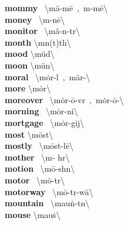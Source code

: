 \documentclass[10pt,a4paper]{article}
\begin{document}
\begin{multicols}{2}
\textbf{ mommy }\quad \ \textbackslash \textprimstress m\"{a}-m\={e}\ ,\ \textprimstress m\textschwa -m\={e}\textbackslash \\
\textbf{ money }\quad \ \textbackslash \textprimstress m\textschwa -n\={e}\textbackslash \\
\textbf{ monitor }\quad \ \textbackslash \textprimstress m\"{a}-n\textschwa -t\textschwa r\textbackslash \\
\textbf{ month }\quad \textbackslash \textprimstress m\textschwa n(t)th\textbackslash \\
\textbf{ mood }\quad \textbackslash \textprimstress m\"{u}d\textbackslash \\
\textbf{ moon }\quad \textbackslash \textprimstress m\"{u}n\textbackslash \\
\textbf{ moral }\quad \ \textbackslash \textprimstress m\.{o}r-\textschwa l\ ,\ \textprimstress m\"{a}r-\textbackslash \\
\textbf{ more }\quad \textbackslash \textprimstress m\.{o}r\textbackslash \\
\textbf{ moreover }\quad \ \textbackslash m\.{o}r-\textprimstress \={o}-v\textschwa r\ ,\ \textprimstress m\.{o}r-\textsecstress \={o}-\textbackslash \\
\textbf{ morning }\quad \ \textbackslash \textprimstress m\.{o}r-ni\engma \textbackslash \\
\textbf{ mortgage }\quad \ \textbackslash \textprimstress m\.{o}r-gij\textbackslash \\
\textbf{ most }\quad \textbackslash \textprimstress m\={o}st\textbackslash \\
\textbf{ mostly }\quad \ \textbackslash \textprimstress m\={o}st-l\={e}\textbackslash \\
\textbf{ mother }\quad \ \textbackslash \textprimstress m\textschwa - h\textschwa r\textbackslash \\
\textbf{ motion }\quad \ \textbackslash \textprimstress m\={o}-sh\textschwa n\textbackslash \\
\textbf{ motor }\quad \ \textbackslash \textprimstress m\={o}-t\textschwa r\textbackslash \\
\textbf{ motorway }\quad \ \textbackslash \textprimstress m\={o}-t\textschwa r-\textsecstress w\={a}\textbackslash \\
\textbf{ mountain }\quad \ \textbackslash \textprimstress mau\. n-t\textsuperscript{\textreve}n\textbackslash \\
\textbf{ mouse }\quad \textbackslash \textprimstress mau\. s\textbackslash \\

\end{multicols}
\end{document}
